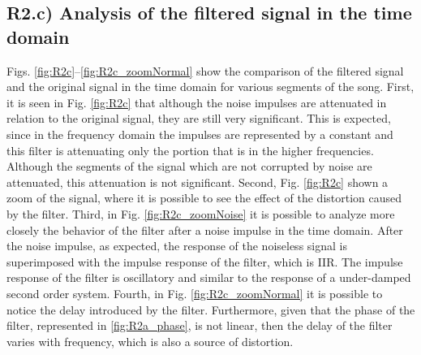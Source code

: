 \documentclass[]{scrartcl}
\begin{document}
\subsection{R2.c) Analysis of the filtered signal in the time domain}

Figs. \ref{fig:R2c}--\ref{fig:R2c_zoomNormal} show the comparison of the filtered signal and the original signal in the time domain for various segments of the song. First, it is seen in Fig. \ref{fig:R2c} that although the noise impulses are attenuated in relation to the original signal, they are still very significant. This is expected, since in the frequency domain the impulses are represented by a constant and this filter is attenuating only the portion that is in the higher frequencies. Although the segments of the signal which are not corrupted by noise are attenuated, this attenuation is not significant. Second, Fig. \ref{fig:R2c} shown a zoom of the signal, where it is possible to see the effect of the distortion caused by the filter. Third, in Fig. \ref{fig:R2c_zoomNoise} it is possible to analyze more closely the behavior of the filter after a noise impulse in the time domain. After the noise impulse, as expected, the response of the noiseless signal is superimposed with the impulse response of the filter, which is IIR. The impulse response of the filter is oscillatory and similar to the response of a under-damped second order system. Fourth, in Fig. \ref{fig:R2c_zoomNormal} it is possible to notice the delay introduced by the filter. Furthermore, given that the phase of the filter, represented in \ref{fig:R2a_phase}, is not linear, then the delay of the filter varies with frequency, which is also a source of distortion.
\end{document}

